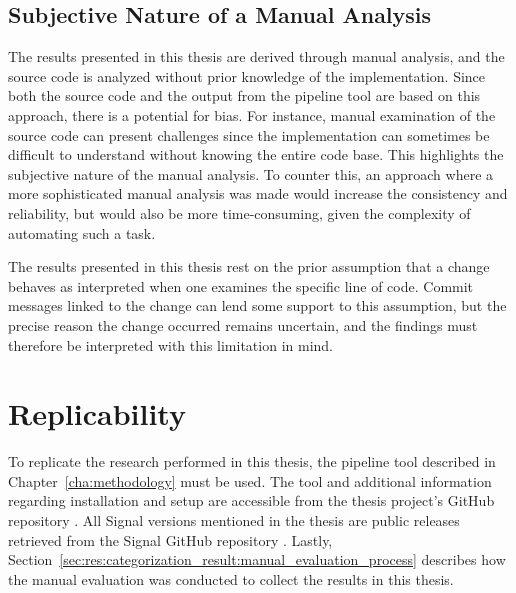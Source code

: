 \subsection{Subjective Nature of a Manual Analysis}
\label{sec:discussion:subjective_nature_manual_analysis}
The results presented in this thesis are derived through manual analysis, and the source code is analyzed without prior knowledge of the implementation. Since both the source code and the output from the pipeline tool are based on this approach, there is a potential for bias. For instance, manual examination of the source code can present challenges since the implementation can sometimes be difficult to understand without knowing the entire code base. This highlights the subjective nature of the manual analysis. To counter this, an approach where a more sophisticated manual analysis was made would increase the consistency and reliability, but would also be more time-consuming, given the complexity of automating such a task.

The results presented in this thesis rest on the prior assumption that a change behaves as interpreted when one examines the specific line of code. Commit messages linked to the change can lend some support to this assumption, but the precise reason the change occurred remains uncertain, and the findings must therefore be interpreted with this limitation in mind.

\section{Replicability}
\label{sec:replicability}
To replicate the research performed in this thesis, the pipeline tool described in Chapter~\ref{cha:methodology} must be used. The tool and additional information regarding installation and setup are accessible from the thesis project's GitHub repository \cite{public_project_github}. All Signal versions mentioned in the thesis are public releases retrieved from the Signal GitHub repository \cite{githubSignal}. Lastly, Section~\ref{sec:res:categorization_result:manual_evaluation_process} describes how the manual evaluation was conducted to collect the results in this thesis.

